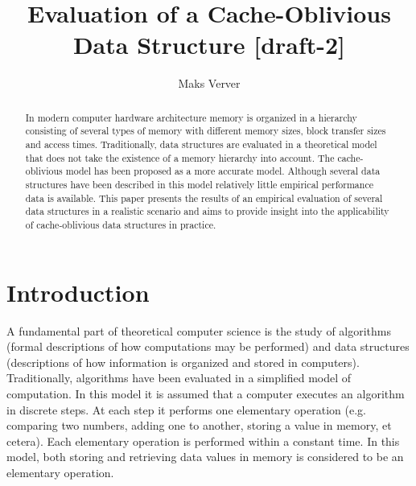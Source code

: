 \documentclass{acm_proc_article-sp}
\begin{document}
\title{Evaluation of a Cache-Oblivious Data Structure [draft-2]}

\author{Maks Verver\\ }


\maketitle

\begin{abstract}
In modern computer hardware architecture memory is organized in a hierarchy
consisting of several types of memory with different memory sizes, block
transfer sizes and access times.
Traditionally, data structures are evaluated in a theoretical model that
does not take the existence of a memory hierarchy into account. The
cache-oblivious model has been proposed as a more accurate model.
Although several data structures have been described in this model
relatively little empirical performance data is available.
This paper presents the results of an empirical evaluation of several data
structures in a realistic scenario and aims to provide insight into
the applicability of cache-oblivious data structures in practice.
\end{abstract}


\section{Introduction}
A fundamental part of theoretical computer science is the study of algorithms (formal descriptions of how computations may be performed) and data structures (descriptions of how information is organized and stored in computers). Traditionally, algorithms have been evaluated in a simplified model of computation. In this model it is assumed that a computer executes an algorithm in discrete steps. At each step it performs one elementary operation (e.g. comparing two numbers, adding one to another, storing a value in memory, et cetera). Each elementary operation is performed within a constant time. In this model, both storing and retrieving data values in memory is considered to be an elementary operation.
\end{document}
